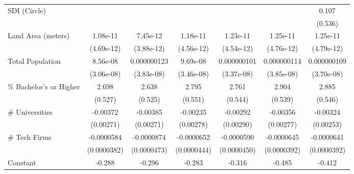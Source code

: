 {\begin{tabular}{l*{6}{c}}
SDI (Circle)        &                     &                     &                     &                     &                     &       0.107         \\
                    &                     &                     &                     &                     &                     &     (0.536)         \\
\addlinespace
Land Area (meters)  &    1.08e-11\sym{**} &    7.45e-12\sym{*}  &    1.18e-11\sym{**} &    1.23e-11\sym{**} &    1.25e-11\sym{**} &    1.25e-11\sym{**} \\
                    &  (4.69e-12)         &  (3.88e-12)         &  (4.56e-12)         &  (4.54e-12)         &  (4.76e-12)         &  (4.79e-12)         \\
\addlinespace
Total Population    &    8.56e-08\sym{***}& 0.000000123\sym{***}&    9.69e-08\sym{***}& 0.000000101\sym{***}& 0.000000114\sym{***}& 0.000000109\sym{***}\\
                    &  (3.06e-08)         &  (3.83e-08)         &  (3.46e-08)         &  (3.37e-08)         &  (3.85e-08)         &  (3.70e-08)         \\
\addlinespace
\% Bachelor's or Higher&       2.698\sym{***}&       2.638\sym{***}&       2.795\sym{***}&       2.761\sym{***}&       2.904\sym{***}&       2.885\sym{***}\\
                    &     (0.527)         &     (0.525)         &     (0.551)         &     (0.544)         &     (0.539)         &     (0.546)         \\
\addlinespace
\# Universities     &    -0.00372         &    -0.00385         &    -0.00235         &    -0.00292         &    -0.00356         &    -0.00324         \\
                    &   (0.00271)         &   (0.00271)         &   (0.00278)         &   (0.00290)         &   (0.00277)         &   (0.00253)         \\
\addlinespace
\# Tech Firms       &  -0.0000584         &  -0.0000874\sym{*}  &  -0.0000652         &  -0.0000590         &  -0.0000645         &  -0.0000641         \\
                    & (0.0000382)         & (0.0000473)         & (0.0000444)         & (0.0000450)         & (0.0000392)         & (0.0000392)         \\
\addlinespace
Constant            &      -0.288         &      -0.296\sym{*}  &      -0.283         &      -0.316\sym{*}  &      -0.485\sym{*}  &      -0.412         \\

\end{tabular}}
